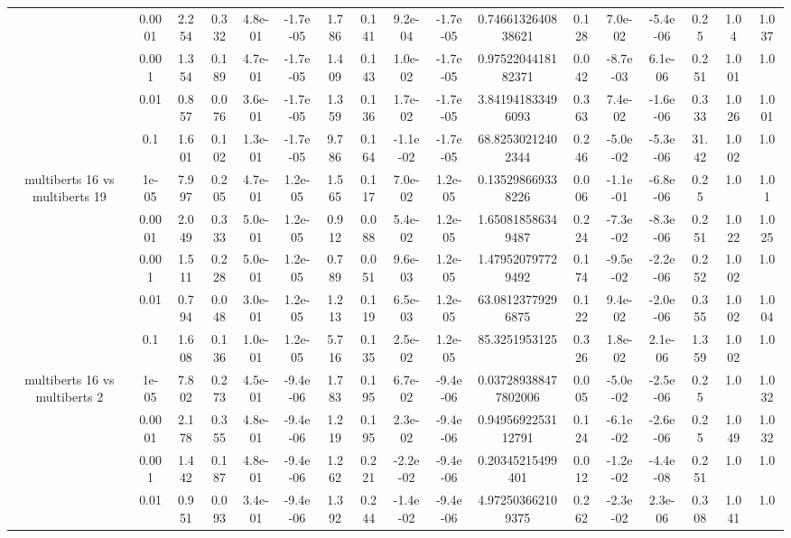 \begin{tabular}{|c|c|c|c|c|c|c|c|c|c|c|c|c|c|c|c|c|}
 & 0.0001 & 2.254 & 0.332 & 4.8e-01 & -1.7e-05 & 1.786 & 0.141 & 9.2e-04 & -1.7e-05 & 0.7466132640838621 & 0.128 & 7.0e-02 & -5.4e-06 & 0.25 & 1.04 & 1.037 \\
 & 0.001 & 1.354 & 0.189 & 4.7e-01 & -1.7e-05 & 1.409 & 0.143 & 1.0e-02 & -1.7e-05 & 0.9752204418182371 & 0.042 & -8.7e-03 & 6.1e-06 & 0.251 & 1.001 & 1.0 \\
 & 0.01 & 0.857 & 0.076 & 3.6e-01 & -1.7e-05 & 1.359 & 0.136 & 1.7e-02 & -1.7e-05 & 3.841941833496093 & 0.363 & 7.4e-02 & -1.6e-06 & 0.333 & 1.026 & 1.001 \\
 & 0.1 & 1.601 & 0.102 & 1.3e-01 & -1.7e-05 & 9.786 & 0.164 & -1.1e-02 & -1.7e-05 & 68.82530212402344 & 0.246 & -5.0e-02 & -5.3e-06 & 31.42 & 1.002 & 1.0 \\
\hline
\multirow{5}{*}{multiberts 16 vs multiberts 19} & 1e-05 & 7.997 & 0.205 & 4.7e-01 & 1.2e-05 & 1.565 & 0.117 & 7.0e-02 & 1.2e-05 & 0.135298669338226 & 0.006 & -1.1e-01 & -6.8e-06 & 0.25 & 1.0 & 1.01 \\
 & 0.0001 & 2.049 & 0.333 & 5.0e-01 & 1.2e-05 & 0.912 & 0.088 & 5.4e-02 & 1.2e-05 & 1.650818586349487 & 0.224 & -7.3e-02 & -8.3e-06 & 0.251 & 1.022 & 1.025 \\
 & 0.001 & 1.511 & 0.228 & 5.0e-01 & 1.2e-05 & 0.789 & 0.051 & 9.6e-03 & 1.2e-05 & 1.479520797729492 & 0.174 & -9.5e-02 & -2.2e-06 & 0.252 & 1.002 & 1.0 \\
 & 0.01 & 0.794 & 0.048 & 3.0e-01 & 1.2e-05 & 1.213 & 0.119 & 6.5e-03 & 1.2e-05 & 63.08123779296875 & 0.122 & 9.4e-02 & -2.0e-06 & 0.355 & 1.002 & 1.004 \\
 & 0.1 & 1.608 & 0.136 & 1.0e-01 & 1.2e-05 & 5.716 & 0.135 & 2.5e-02 & 1.2e-05 & 85.3251953125 & 0.326 & 1.8e-02 & 2.1e-06 & 1.359 & 1.002 & 1.0 \\
\hline
\multirow{5}{*}{multiberts 16 vs multiberts 2} & 1e-05 & 7.802 & 0.273 & 4.5e-01 & -9.4e-06 & 1.783 & 0.195 & 6.7e-02 & -9.4e-06 & 0.037289388477802006 & 0.005 & -5.0e-02 & -2.5e-06 & 0.25 & 1.0 & 1.032 \\
 & 0.0001 & 2.178 & 0.355 & 4.8e-01 & -9.4e-06 & 1.219 & 0.195 & 2.3e-02 & -9.4e-06 & 0.9495692253112791 & 0.124 & -6.1e-02 & -2.6e-06 & 0.25 & 1.049 & 1.032 \\
 & 0.001 & 1.442 & 0.187 & 4.8e-01 & -9.4e-06 & 1.262 & 0.221 & -2.2e-02 & -9.4e-06 & 0.20345215499401 & 0.012 & -1.2e-02 & -4.4e-08 & 0.251 & 1.0 & 1.0 \\
 & 0.01 & 0.951 & 0.093 & 3.4e-01 & -9.4e-06 & 1.392 & 0.244 & -1.4e-02 & -9.4e-06 & 4.972503662109375 & 0.262 & -2.3e-02 & 2.3e-06 & 0.308 & 1.041 & 1.0 \\

\end{tabular}
